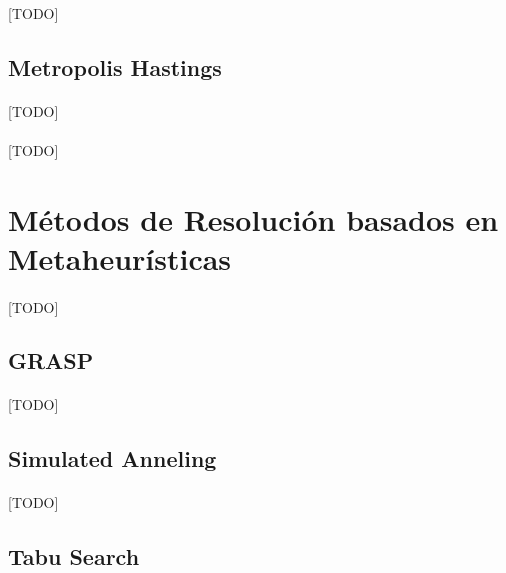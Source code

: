\documentclass{subfiles}
\begin{document}
          \paragraph{}
          [TODO]

      \subsection{Metropolis Hastings}
      \label{sec:solving_metropolis}

        \paragraph{}
        [TODO]

      \paragraph{}
      [TODO]

    \section{Métodos de Resolución basados en Metaheurísticas}
    \label{sec:solving_metaheuristics}

      \paragraph{}
      [TODO]

      \subsection{GRASP}
      \label{sec:solving_grasp}

        \paragraph{}
        [TODO]

      \subsection{Simulated Anneling}
      \label{sec:solving_simulated_anneling}

        \paragraph{}
        [TODO]

      \subsection{Tabu Search}
      \label{sec:solving_tabu}
\end{document}
